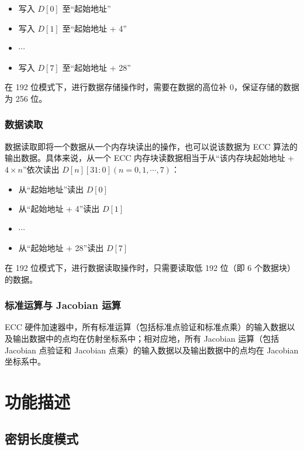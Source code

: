 \documentclass[main\_\_CN.tex]{subfiles}
\begin{document}
\begin{itemize}
    \item 写入 $D[0]$ 至“起始地址”
    \item 写入 $D[1]$ 至“起始地址 + 4”
    \item $\cdots$
    \item 写入 $D[7]$ 至“起始地址 + 28”
\end{itemize}
\begin{tiplisting}
在 192 位模式下，进行数据存储操作时，需要在数据的高位补 0，保证存储的数据为 256 位。
\end{tiplisting}

\subsubsection{数据读取}

数据读取即将一个数据从一个内存块读出的操作，也可以说该数据为 ECC 算法的输出数据。具体来说，从一个 ECC 内存块读数据相当于从“该内存块起始地址 + $
4 \times n$”依次读出 $D[n][31:0] (n=0, 1, \cdots, 7)$：
\begin{itemize}
    \item 从“起始地址”读出 $D[0]$
    \item 从“起始地址 + 4”读出 $D[1]$
    \item $\cdots$
    \item 从“起始地址 + 28”读出 $D[7]$
\end{itemize}

\begin{tiplisting}
在 192 位模式下，进行数据读取操作时，只需要读取低 192 位（即 6 个数据块）的数据。
\end{tiplisting}

\subsubsection{标准运算与 Jacobian 运算}

\chipname{} ECC 硬件加速器中，所有标准运算（包括标准点验证和标准点乘）的输入数据以及输出数据中的点均在仿射坐标系中；相对应地，所有 Jacobian 运算（包括 Jacobian 点验证和 Jacobian 点乘）的输入数据以及输出数据中的点均在 Jacobian 坐标系中。

\section{功能描述}
\label{sec:ecc-mode-config}
\subsection{密钥长度模式}
\end{document}
